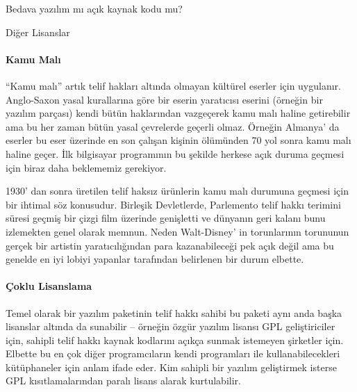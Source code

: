 \documentclass[10pt,a5paper]{book}
\begin{document}
\begin{section}{Bedava yazılım mı açık kaynak kodu mu?}
\begin{subsection}{Diğer Lisanslar}
\paragraph{Kamu Malı}{“Kamu malı” artık telif hakları altında olmayan kültürel eserler için uygulanır. Anglo-Saxon yasal kurallarına göre bir eserin yaratıcısı eserini (örneğin bir yazılım parçası) kendi bütün haklarından vazgeçerek kamu malı haline getirebilir ama bu her zaman bütün yasal çevrelerde geçerli olmaz. Örneğin Almanya' da eserler bu eser üzerinde en son çalışan kişinin ölümünden 70 yol sonra kamu malı haline geçer. İlk bilgisayar programının bu şekilde herkese açık duruma geçmesi için biraz daha beklememiz gerekiyor.}

1930' dan sonra üretilen telif haksız ürünlerin kamu malı durumuna geçmesi için bir ihtimal söz konusudur. Birleşik Devletlerde, Parlemento telif hakkı terimini süresi geçmiş bir çizgi film üzerinde genişletti ve dünyanın geri kalanı bunu izlemekten genel olarak memnun. Neden Walt-Disney' in torunlarının torununun gerçek bir artistin yaratıcılığından para kazanabileceği pek açık değil ama bu genelde en iyi lobiyi yapanlar tarafından belirlenen bir durum elbette.

\paragraph{Çoklu Lisanslama}{Temel olarak bir yazılım paketinin telif hakkı sahibi bu paketi aynı anda başka lisanslar altında da sunabilir – örneğin özgür yazılım lisansı GPL geliştiriciler için, sahipli telif hakkı kaynak kodlarını açıkça sunmak istemeyen şirketler için. Elbette bu en çok diğer programcıların kendi programları ile kullanabilecekleri kütüphaneler için anlam ifade eder. Kim sahipli bir yazılım geliştirmek isterse GPL kısıtlamalarından paralı lisans alarak kurtulabilir.}

\end{subsection}
\end{section}
\end{document}
